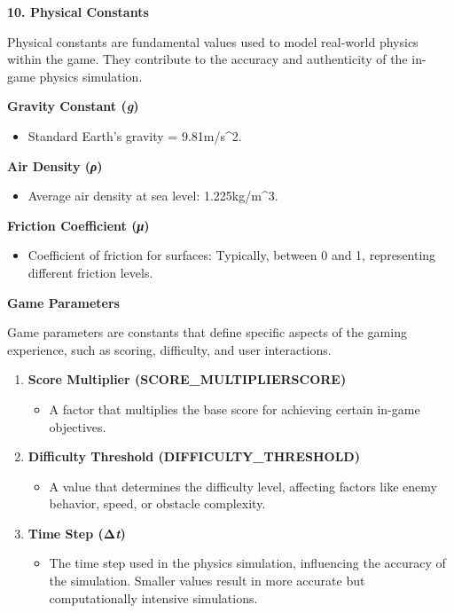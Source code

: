 \documentclass[
]{article}
\begin{document}
\protect\hypertarget{qzzz}{}{}\textbf{10. Physical Constants}

Physical constants are fundamental values used to model real-world
physics within the game. They contribute to the accuracy and
authenticity of the in-game physics simulation.

\textbf{Gravity Constant (\emph{g})}

\begin{itemize}
\item
  Standard Earth's gravity = 9.81m/s\^{}2.
\end{itemize}

\textbf{Air Density (\emph{ρ})}

\begin{itemize}
\item
  Average air density at sea level: 1.225kg/m\^{}3.
\end{itemize}

\textbf{Friction Coefficient (\emph{μ})}

\begin{itemize}
\item
  Coefficient of friction for surfaces: Typically, between 0 and 1,
  representing different friction levels.
\end{itemize}

\textbf{Game Parameters}

Game parameters are constants that define specific aspects of the gaming
experience, such as scoring, difficulty, and user interactions.

\begin{enumerate}
\def\labelenumi{\arabic{enumi}.}
\item
  \textbf{Score Multiplier (SCORE\_MULTIPLIERSCORE)}

  \begin{itemize}
  \item
    A factor that multiplies the base score for achieving certain
    in-game objectives.
  \end{itemize}
\item
  \textbf{Difficulty Threshold (DIFFICULTY\_THRESHOLD)}

  \begin{itemize}
  \item
    A value that determines the difficulty level, affecting factors like
    enemy behavior, speed, or obstacle complexity.
  \end{itemize}
\item
  \textbf{Time Step (Δ\emph{t})}

  \begin{itemize}
  \item
    The time step used in the physics simulation, influencing the
    accuracy of the simulation. Smaller values result in more accurate
    but computationally intensive simulations.
  \end{itemize}
\end{enumerate}
\end{document}
